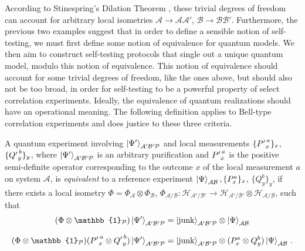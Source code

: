 According to Stinespring's Dilation Theorem \cite{Watrous2018}, these trivial degrees of freedom can account for arbitrary local isometries $\mathcal{A}\rightarrow\mathcal{AA'}$, $\mathcal{B}\rightarrow\mathcal{BB'}$. Furthermore, the previous two examples suggest that in order to define a sensible notion of self-testing, we must first define some notion of equivalence for quantum models. We then aim to construct self-testing protocols that single out a unique quantum model, modulo this notion of equivalence. This notion of equivalence should account for some trivial degrees of freedom, like the ones above, but should also not be too broad, in order for self-testing to be a powerful property of select correlation experiments. Ideally, the equivalence of quantum realizations should have an operational meaning. The following definition applies to Bell-type correlation experiments and does justice to these three criteria.

\begin{definition}
\label{def:equivexp}
A quantum experiment involving $\ket{\Psi'}_{\mathcal{A'B'P}}$ and local measurements $\{{P'}^{\thinspace a}_x\}_x$, $\{{Q'}^{\thinspace b}_y\}_y$, where $\ket{\Psi'}_{\mathcal{A'B'P}}$ is an arbitrary purification and ${P'}^{\thinspace a}_x$ is the positive semi-definite operator corresponding to the outcome $x$ of the local measurement $a$ on system $\mathcal{A}$, is \emph{equivalent} to a reference experiment $\ket{\Psi}_{\mathcal{AB}}, \{P_x^a\}_x$, $\{Q_y^b\}_y$, if there exists a local isometry $\Phi=\Phi_{\mathcal{A}}\otimes\Phi_{\mathcal{B}}$, $\Phi_{\mathcal{A/B}}\colon\mathcal{H}_{\mathcal{A'/B'}}\rightarrow\mathcal{H}_{\mathcal{A'/B'}}\otimes\mathcal{H}_{\mathcal{A/B}}$, such that
\begin{align*}
    (\Phi\otimes\mathbb{1}_{\mathcal{P}})\ket{\Psi'}_{\mathcal{A'B'P}} & =\ket{\text{junk}}_\mathcal{{A'B'P}}\otimes\ket{\Psi}_{\mathcal{AB}} \\[0.7em]
    (\Phi\otimes\mathbb{1}_{\mathcal{P}})({P'}^{\thinspace a}_x\otimes {Q'}^{\thinspace b}_y)\ket{\Psi'}_{\mathcal{A'B'P}} & =\ket{\text{junk}}_{\mathcal{A'B'P}}\otimes(P^a_x\otimes Q^b_y)\ket{\Psi}_{\mathcal{AB}} \thinspace .
\end{align*}
\end{definition}

